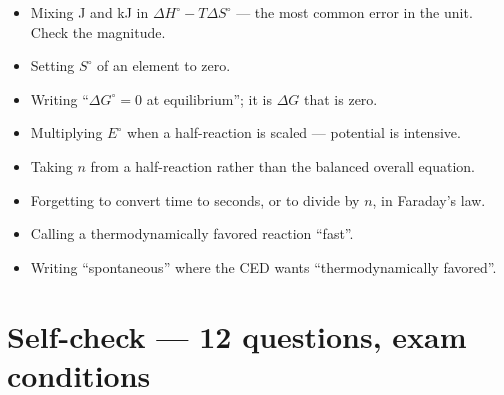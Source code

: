 \documentclass{apchem-worksheet}
\begin{document}
\begin{itemize}[leftmargin=*,itemsep=0.2em]
  \item Mixing J and kJ in $\Delta H^\circ - T\Delta S^\circ$ --- the most
        common error in the unit. Check the magnitude.
  \item Setting $S^\circ$ of an element to zero.
  \item Writing ``$\Delta G^\circ = 0$ at equilibrium''; it is
        $\Delta G$ that is zero.
  \item Multiplying $E^\circ$ when a half-reaction is scaled --- potential
        is intensive.
  \item Taking $n$ from a half-reaction rather than the balanced overall
        equation.
  \item Forgetting to convert time to seconds, or to divide by $n$, in
        Faraday's law.
  \item Calling a thermodynamically favored reaction ``fast''.
  \item Writing ``spontaneous'' where the CED wants
        ``thermodynamically favored''.
\end{itemize}

\section*{\sffamily Self-check --- 12 questions, exam conditions}
\end{document}
